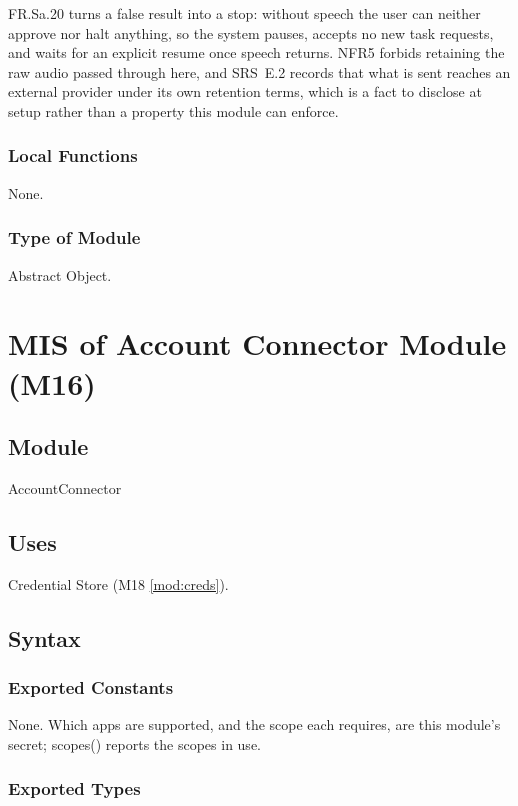 \documentclass[12pt, titlepage]{article}
\begin{document}
\noindent FR.Sa.20 turns a false result into a stop: without speech the user can
neither approve nor halt anything, so the system pauses, accepts no new task
requests, and waits for an explicit resume once speech returns. NFR5 forbids
retaining the raw audio passed through here, and SRS~E.2 records that what is
sent reaches an external provider under its own retention terms, which is a fact
to disclose at setup rather than a property this module can enforce.

\subsubsection{Local Functions}

None.

\subsubsection{Type of Module}

Abstract Object.

\newpage

\section{MIS of Account Connector Module (M16)} \label{mod:account}

\subsection{Module}

AccountConnector

\subsection{Uses}

Credential Store (M18 \ref{mod:creds}).

\subsection{Syntax}

\subsubsection{Exported Constants}

None. Which apps are supported, and the scope each requires, are this module's
secret; scopes() reports the scopes in use.

\subsubsection{Exported Types}
\end{document}
